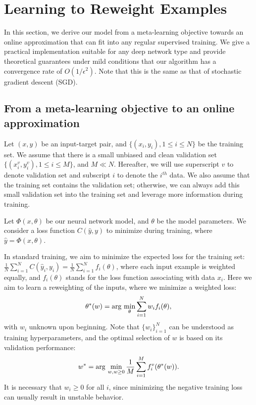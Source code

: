 \section{Learning to Reweight Examples}

In this section, we derive our model from a meta-learning objective towards an online approximation
that can fit into any regular supervised training. We give a practical implementation suitable for
any deep network type and  provide theoretical guarantees under mild conditions that our algorithm
has a convergence rate of $O(1/\epsilon^2)$. Note that  this is the same as that of stochastic
gradient descent (SGD).

\subsection{From a meta-learning objective to an online approximation}

Let $(x,y)$ be an input-target pair, and $\{(x_i, y_i), 1 \le i \le N\}$ be the training set. We
assume that there is a small unbiased and clean validation set $\{(x^v_i, y^v_i), 1 \le i \le M\}$,
and $M \ll N$. Hereafter, we will use superscript $v$ to denote validation set and subscript $i$ to
denote the $i^{th}$ data. We also assume that the training set contains the validation set;
otherwise, we can always add this small validation set into the training set and leverage more
information during training.

Let $\Phi (x,\theta)$ be our neural network model, and $\theta$ be the model parameters. We consider
a loss function $C(\hat{y}, y)$ to minimize during training, where $\hat{y} = \Phi (x, \theta)$.

In standard training, we aim to minimize the expected loss for the training set: $\frac{1}{N}
\sum_{i=1}^N C(\hat{y}_i, y_i)=\frac{1}{N} \sum_{i=1}^N f_i(\theta)$, where each input example is
weighted equally, and $f_i(\theta)$ stands for the loss function associating with data $x_i$. Here
we aim to learn a reweighting of the inputs, where we minimize a weighted loss:
\begin{equation}
\label{eq:theta_star}
\theta^*(w) = \arg\,\min_\theta \sum_{i=1}^N w_i f_i(\theta),
\end{equation}
with $w_i$  unknown upon beginning. Note that $\{w_i\}_{i=1}^N$ can be understood as  training
hyperparameters, and the optimal selection of $w$ is based on its validation performance:
\begin{equation}\label{eq:w_star}
w^* = \arg\,\min_{w, w \ge 0} \frac{1}{M} \sum_{i=1}^M f_i^v(\theta^*(w)).
\end{equation}
It is necessary that $w_i \ge 0$ for all $i$, since  minimizing the negative training loss can
usually result in unstable behavior.

